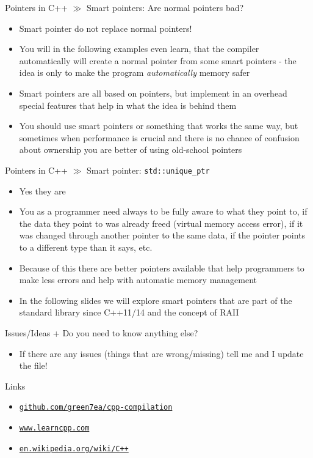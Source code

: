 \documentclass[10pt]{beamer}
\newcommand{\urlCustom}[1]{\href{https://#1}{\textcolor{greyCustom}{\texttt{#1}}}}
\begin{document}
\begin{frame}{Pointers in C++ $\gg$ Smart pointers: Are normal pointers bad?}
\begin{itemize}
	\item Smart pointer do not replace normal pointers!
	\item You will in the following examples even learn, that the compiler automatically will create a normal pointer from some smart pointers - the idea is only to make the program \textit{automatically} memory safer
	\item Smart pointers are all based on pointers, but implement in an overhead special features that help in what the idea is behind them
	\item You should use smart pointers or something that works the same way, but sometimes when performance is crucial and there is no chance of confusion about ownership you are better of using old-school pointers
\end{itemize}
\end{frame}

\begin{frame}{Pointers in C++ $\gg$ Smart pointer: \texttt{std::unique_ptr}}
\begin{itemize}
	\item Yes they are
	\item You as a programmer need always to be fully aware to what they point to, if the data they point to was already freed (virtual memory access error), if it was changed through another pointer to the same data, if the pointer points to a different type than it says, etc.
	\item Because of this there are better pointers available that help programmers to make less errors and help with automatic memory management
	\item In the following slides we will explore smart pointers that are part of the standard library since C++11/14 and the concept of RAII
\end{itemize}
\end{frame}


\begin{frame}{Issues/Ideas + Do you need to know anything else?}
	\begin{itemize}
		\item If there are any issues (things that are wrong/missing) tell me and I update the file!
	\end{itemize}
\end{frame}

\begin{frame}{Links}
	\begin{itemize}
		\item\urlCustom{github.com/green7ea/cpp-compilation}
		\item\urlCustom{www.learncpp.com}
		\item\urlCustom{en.wikipedia.org/wiki/C++}
		
	\end{itemize}
	\begin{center}\doclicenseThis\end{center}
\end{frame}
\end{document}
